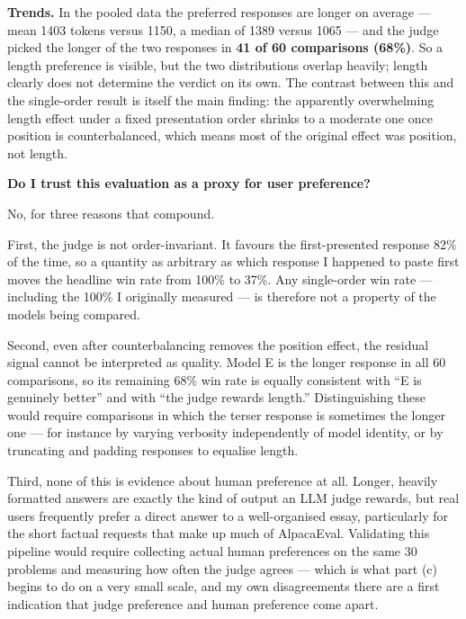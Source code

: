\begin{answer}
\textbf{Trends.} In the pooled data the preferred responses are longer on
average --- mean 1403 tokens versus 1150, a median of 1389 versus 1065 --- and
the judge picked the longer of the two responses in \textbf{41 of 60
comparisons (68\%)}. So a length preference is visible, but the two
distributions overlap heavily; length clearly does not determine the verdict on
its own. The contrast between this and the single-order result is itself the
main finding: the apparently overwhelming length effect under a fixed
presentation order shrinks to a moderate one once position is counterbalanced,
which means most of the original effect was position, not length.

\textbf{Do I trust this evaluation as a proxy for user preference?}

No, for three reasons that compound.

First, the judge is not order-invariant. It favours the first-presented response
82\% of the time, so a quantity as arbitrary as which response I happened to
paste first moves the headline win rate from 100\% to 37\%. Any single-order win
rate --- including the 100\% I originally measured --- is therefore not a
property of the models being compared.

Second, even after counterbalancing removes the position effect, the residual
signal cannot be interpreted as quality. Model E is the longer response in all
60 comparisons, so its remaining 68\% win rate is equally consistent with ``E is
genuinely better'' and with ``the judge rewards length.'' Distinguishing these
would require comparisons in which the terser response is sometimes the longer
one --- for instance by varying verbosity independently of model identity, or by
truncating and padding responses to equalise length.

Third, none of this is evidence about human preference at all. Longer, heavily
formatted answers are exactly the kind of output an LLM judge rewards, but real
users frequently prefer a direct answer to a well-organised essay, particularly
for the short factual requests that make up much of AlpacaEval. Validating this
pipeline would require collecting actual human preferences on the same 30
problems and measuring how often the judge agrees --- which is what part (c)
begins to do on a very small scale, and my own disagreements there are a first
indication that judge preference and human preference come apart.

\end{answer}
